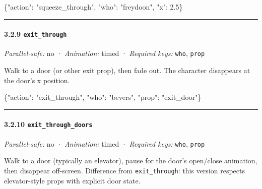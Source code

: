\documentclass[
  12pt,
  letterpaper,
]{book}
\newenvironment{Shaded}{}{}
\newcommand{\DataTypeTok}[1]{\textcolor[rgb]{0.56,0.13,0.00}{#1}}
\newcommand{\FloatTok}[1]{\textcolor[rgb]{0.25,0.63,0.44}{#1}}
\newcommand{\FunctionTok}[1]{\textcolor[rgb]{0.02,0.16,0.49}{#1}}
\newcommand{\StringTok}[1]{\textcolor[rgb]{0.25,0.44,0.63}{#1}}
\begin{document}
\begin{Shaded}
\begin{Highlighting}[]
\FunctionTok{\{}\DataTypeTok{"action"}\FunctionTok{:} \StringTok{"squeeze\_through"}\FunctionTok{,} \DataTypeTok{"who"}\FunctionTok{:} \StringTok{"freydoon"}\FunctionTok{,} \DataTypeTok{"x"}\FunctionTok{:} \FloatTok{2.5}\FunctionTok{\}}
\end{Highlighting}
\end{Shaded}

\begin{center}\rule{0.5\linewidth}{0.5pt}\end{center}

\paragraph{\texorpdfstring{3.2.9
\texttt{exit\_through}}{3.2.9 exit\_through}}\label{exit_through}

\emph{Parallel-safe:} no · \emph{Animation:} timed · \emph{Required
keys:} \texttt{who}, \texttt{prop}

Walk to a door (or other exit prop), then fade out. The character
disappears at the door's x position.

\begin{Shaded}
\begin{Highlighting}[]
\FunctionTok{\{}\DataTypeTok{"action"}\FunctionTok{:} \StringTok{"exit\_through"}\FunctionTok{,} \DataTypeTok{"who"}\FunctionTok{:} \StringTok{"bevers"}\FunctionTok{,} \DataTypeTok{"prop"}\FunctionTok{:} \StringTok{"exit\_door"}\FunctionTok{\}}
\end{Highlighting}
\end{Shaded}

\begin{center}\rule{0.5\linewidth}{0.5pt}\end{center}

\paragraph{\texorpdfstring{3.2.10
\texttt{exit\_through\_doors}}{3.2.10 exit\_through\_doors}}\label{exit_through_doors}

\emph{Parallel-safe:} no · \emph{Animation:} timed · \emph{Required
keys:} \texttt{who}, \texttt{prop}

Walk to a door (typically an elevator), pause for the door's open/close
animation, then disappear off-screen. Difference from
\texttt{exit\_through}: this version respects elevator-style props with
explicit door state.
\end{document}
